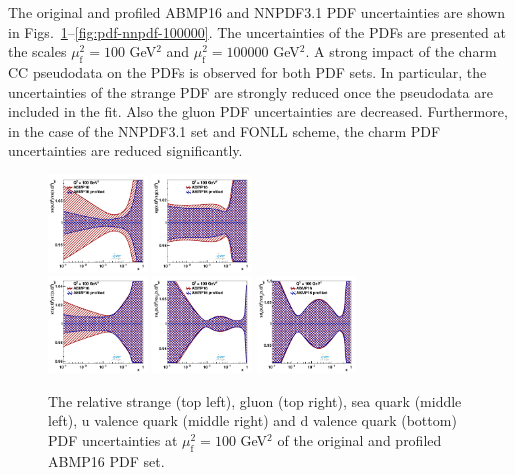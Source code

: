 \documentclass[pdftex,twocolumn,epjc3]{svjour3}          %
\newcommand{\abmp} {ABMP16\xspace}
\newcommand{\nnpdf} {NNPDF3.1\xspace}
\begin{document}
The original and profiled \abmp and \nnpdf PDF uncertainties are shown in Figs.~\ref{fig:pdf-abmp}--\ref{fig:pdf-nnpdf-100000}. 
The uncertainties of the PDFs are presented at the scales $\mu_\mathrm{f}^2=100$ GeV$^2$ and $\mu_\mathrm{f}^2=100000$ GeV$^2$.
A strong impact of the charm CC pseudodata on the PDFs is observed for both PDF sets.
In particular, the uncertainties of the strange PDF are strongly reduced once the pseudodata are included in the fit. 
Also the gluon PDF uncertainties are decreased. Furthermore, in the case of the NNPDF3.1 set and FONLL scheme, the charm PDF uncertainties are reduced significantly.

\begin{figure}
    \centering
    {{\includegraphics[width=0.235\textwidth]{pics/pdf-profile-ffabm/q2_100_pdf_s_ratio.pdf}}}
    {{\includegraphics[width=0.235\textwidth]{pics/pdf-profile-ffabm/q2_100_pdf_g_ratio.pdf}}}\\
    {{\includegraphics[width=0.235\textwidth]{pics/pdf-profile-ffabm/q2_100_pdf_Sea_ratio.pdf}}}
    {{\includegraphics[width=0.235\textwidth]{pics/pdf-profile-ffabm/q2_100_pdf_uv_ratio.pdf}}}
    {{\includegraphics[width=0.235\textwidth]{pics/pdf-profile-ffabm/q2_100_pdf_dv_ratio.pdf}}}
    \caption{The relative strange (top left), gluon (top right), sea quark (middle left), u valence quark (middle right) and d valence quark (bottom) PDF uncertainties at $\mu_\mathrm{f}^2=100$ GeV$^2$ of the original and profiled \abmp PDF set.}
    \label{fig:pdf-abmp}
\end{figure}
\end{document}
